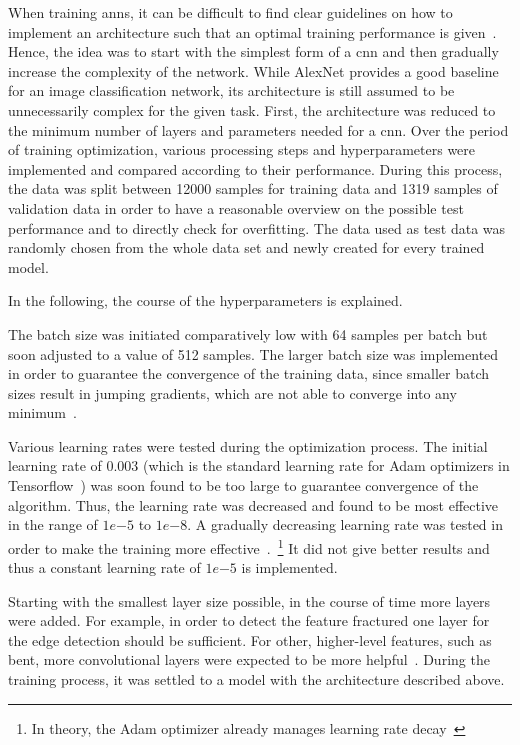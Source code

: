 When training \acrlong{ann}s, it can be difficult to find clear guidelines on how to implement an architecture such that an optimal training performance is given~\citep{heaton2015aifh,geron2019hands,bettilyon2018classify}. Hence, the idea was to start with the simplest form of a \acrshort{cnn} and then gradually increase the complexity of the network. While AlexNet provides a good baseline for an image classification network, its architecture is still assumed to be unnecessarily complex for the given task. First, the architecture was reduced to the minimum number of layers and parameters needed for a \acrshort{cnn}. Over the period of training optimization, various processing steps and hyperparameters were implemented and compared according to their performance. During this process, the data was split between 12000 samples for training data and 1319 samples of validation data in order to have a reasonable overview on the possible test performance and to directly check for overfitting. The data used as test data was randomly chosen from the whole data set and newly created for every trained model.
 
In the following, the course of the hyperparameters is explained.
 
\bigskip
The batch size was initiated comparatively low with 64 samples per batch but soon adjusted to a value of 512 samples. The larger batch size was implemented in order to guarantee the convergence of the training data, since smaller batch sizes result in jumping gradients, which are not able to converge into any minimum~\citep{bengio2012practical}.
 
Various learning rates were tested during the optimization process. The initial learning rate of 0.003 (which is the standard learning rate for Adam optimizers in Tensorflow~\citep{kingma2014adam,geron2019hands}) was soon found to be too large to guarantee convergence of the algorithm. Thus, the learning rate was decreased and found to be most effective in the range of \(1e{-5}\) to \(1e{-8}\). A gradually decreasing learning rate was tested in order to make the training more effective~\citep{bengio2012practical}.~\footnote{In theory, the Adam optimizer already manages learning rate decay~\citep{kingma2014adam}} It did not give better results and thus a constant learning rate of \(1e{-5}\) is implemented.
 
Starting with the smallest layer size possible, in the course of time more layers were added. For example, in order to detect the feature fractured one layer for the edge detection should be sufficient. For other, higher-level features, such as bent, more convolutional layers were expected to be more helpful~\citep{geron2019hands}. During the training process, it was settled to a model with the architecture described above.
 
